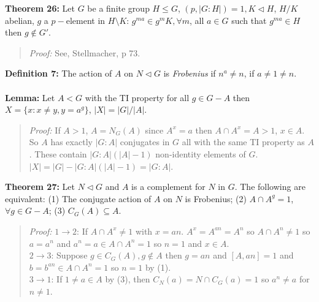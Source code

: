{\bf Theorem 26:} 
Let $G$ be a finite group $H \le G$, $(p, |G:H|)=1, K \lhd H$, $H/K$ abelian,
$g$ a $p-$element in $H \setminus K$: $g^{ma} \in g^m K, \forall m$, all $a \in G$ such that
$g^{ma} \in H$ then $g \notin G'$.
\begin{quote}
\emph{Proof:}  
See, Stellmacher,  p 73.
\end{quote}
{\bf Definition 7:} The action of $A$ on $N \lhd G$ is \emph{Frobenius} if $n^a \neq n$, if $a \neq 1 \neq n$.
\\
\\
{\bf Lemma:}  Let $A<G$ with the TI property for all $g \in G-A$ then
$X= \{x: x \neq y, y= a^g \}$, $|X|= |G|/|A|$.
\begin{quote}
\emph{Proof:}  
If $A>1$, $A=N_G(A)$ since $A^x=a$ then $A \cap A^x=A>1$, $x \in A$.  So $A$ has exactly $|G:A|$ conjugates
in $G$ all with the same TI property as $A$.  These contain $|G:A|(|A|-1)$ non-identity elements of $G$.
$|X|= |G| - |G:A| (|A|-1) = |G:A|$.
\end{quote}
{\bf Theorem 27:}
Let $N \lhd G$ and $A$ is a complement for $N$ in $G$.  The following are equivalent:
(1) The conjugate action of $A$ on $N$ is Frobenius;
(2) $A \cap A^g = 1$, $\forall g \in G-A$;
(3) $C_G(A) \subseteq A$.
\begin{quote}
\emph{Proof:}  
$1 \rightarrow 2$:
If $A \cap A^x \neq 1$ with $x=an$.  $A^x= A^{an}= A^n$ so $A \cap A^n \neq 1$ so
$a=a^n$ and $a^n=a \in A \cap A^n= 1$ so $n=1$ and $x \in A$.
\\
$2 \rightarrow 3$:  Suppose $g \in C_G(A), g \notin A$ then $g=an$ and $[A, an]=1$ and
$b= b^{an} \in A \cap A^n =1$ so $n=1$ by (1).
\\
$3 \rightarrow 1$:
If $1 \neq a  \in A$ by (3), then $C_N(a)= N \cap C_G(a)=1$ so $a^n \neq a$ for $n \neq 1$.
\end{quote}
